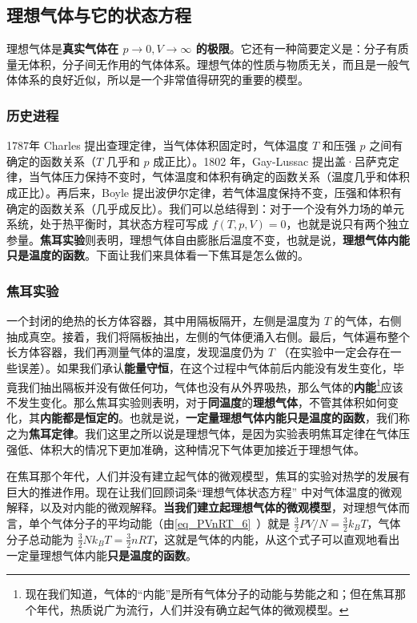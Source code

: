 

\subsection{理想气体与它的状态方程}

理想气体是\textbf{真实气体在 $p\rightarrow 0,V\rightarrow \infty$ 的极限}。它还有一种简要定义是：分子有质量无体积，分子间无作用的气体体系。理想气体的性质与物质无关，而且是一般气体体系的良好近似，所以是一个非常值得研究的重要的模型。
\subsubsection{历史进程}
1787年 Charles 提出查理定律，当气体体积固定时，气体温度 $T$ 和压强 $p$ 之间有确定的函数关系（$T$ 几乎和 $p$ 成正比）。1802 年，Gay-Lussac 提出盖·吕萨克定律，当气体压力保持不变时，气体温度和体积有确定的函数关系（温度几乎和体积成正比）。再后来，Boyle 提出波伊尔定律，若气体温度保持不变，压强和体积有确定的函数关系（几乎成反比）。我们可以总结得到：对于一个没有外力场的单元系统，处于热平衡时，其状态方程可写成 $f(T,p,V)=0$，也就是说只有两个独立参量。\textbf{焦耳实验}则表明，理想气体自由膨胀后温度不变，也就是说，\textbf{理想气体内能只是温度的函数}。下面让我们来具体看一下焦耳是怎么做的。
\subsubsection{焦耳实验}
一个封闭的绝热的长方体容器，其中用隔板隔开，左侧是温度为 $T$ 的气体，右侧抽成真空。接着，我们将隔板抽出，左侧的气体便涌入右侧。最后，气体遍布整个长方体容器，我们再测量气体的温度，发现温度仍为 $T$ （在实验中一定会存在一些误差）。如果我们承认\textbf{能量守恒}，在这个过程中气体前后内能没有发生变化，毕竟我们抽出隔板并没有做任何功，气体也没有从外界吸热，那么气体的\textbf{内能}\footnote{现在我们知道，气体的“内能”是所有气体分子的动能与势能之和；但在焦耳那个年代，热质说广为流行，人们并没有确立起气体的微观模型。}应该不发生变化。那么焦耳实验则表明，对于\textbf{同温度}的\textbf{理想气体}，不管其体积如何变化，其\textbf{内能都是恒定的}。也就是说，\textbf{一定量理想气体内能只是温度的函数}，我们称之为\textbf{焦耳定律}。我们这里之所以说是理想气体，是因为实验表明焦耳定律在气体压强低、体积大的情况下更加准确，这种情况下气体更加接近于理想气体。

在焦耳那个年代，人们并没有建立起气体的微观模型，焦耳的实验对热学的发展有巨大的推进作用。现在让我们回顾词条“理想气体状态方程” 中对气体温度的微观解释，以及对内能的微观解释。\textbf{当我们建立起理想气体的微观模型}，对理想气体而言，单个气体分子的平均动能（由\autoref{eq_PVnRT_6}~）就是 $\frac{3}{2}PV/N = \frac{3}{2}k_B T$，气体分子总动能为 $\frac{3}{2}N k_B T=\frac{3}{2}nRT$，这就是气体的内能，从这个式子可以直观地看出一定量理想气体内能\textbf{只是温度的函数}。

